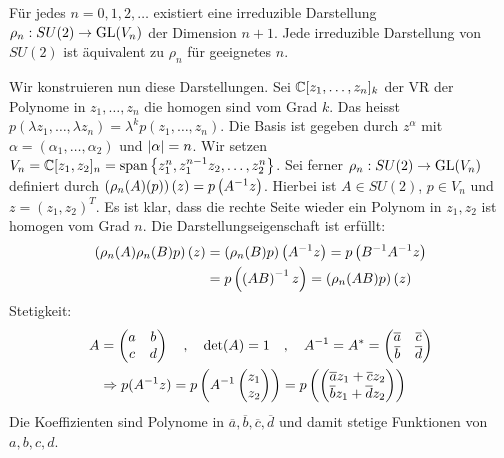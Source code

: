 \begin{satz}
    Für jedes $n=0,1,2,\dots$ existiert eine irreduzible Darstellung $\rho_n :
    SU(2) \rightarrow \text{GL}(V_n)$ der Dimension $n+1$. Jede irreduzible Darstellung
    von $SU(2)$ ist äquivalent zu $\rho_n$ für geeignetes $n$.
\end{satz}

Wir konstruieren nun diese Darstellungen. Sei $\mathbb{C}[z_1,\dots,z_n]_k$ der VR
der Polynome in $z_1,\dots,z_n$ die homogen sind vom Grad $k$. Das heisst
$p(\lambda z_1,\dots,\lambda z_n) = \lambda^k p(z_1,\dots,z_n)$. Die Basis
ist gegeben durch $z^\alpha$ mit $\alpha = (\alpha_1,\dots,\alpha_2)$ und
$\left\vert \alpha \right\vert = n$. Wir setzen $V_n = \mathbb{C}[z_1,z_2]_n = \text{span} \left\{ 
z_1^n , z_1^{n-1} z_2,\dots,z_2^n \right\}$. Sei ferner $\rho_n : SU(2) \rightarrow
\text{GL}(V_n)$ definiert durch $\left( \rho_n (A)(p) \right)(z) = p\left( A^{-1} z \right)$.
Hierbei ist $A \in SU(2)$, $p \in V_n$ und $z=(z_1,z_2)^T$. Es ist klar, dass
die rechte Seite wieder ein Polynom in $z_1,z_2$ ist homogen vom Grad $n$.
Die Darstellungseigenschaft ist erfüllt:
\begin{align*}
    \left( \rho_n(A) \rho_n(B) p \right)(z) &=
    \left( \rho_n(B) p \right) \left( A^{-1} z \right)
    = p \left( B^{-1} A^{-1} z \right)
    \\
    &= p \left( \left( A B \right)^{-1} z \right)
    = \left( \rho_n(A B) p \right)(z)
\end{align*}
Stetigkeit:
\begin{align*}
    A &= \begin{pmatrix}
        a & b \\ c & d
    \end{pmatrix}
    \hspace{10pt} , \hspace{10pt}
    \det(A) = 1
    \hspace{10pt} , \hspace{10pt}
    A^{-1} = A^\ast = \begin{pmatrix}
        \overline{a} & \overline{c} \\ \overline{b} & \overline{d}
    \end{pmatrix}
    \\
    &\Rightarrow p(A^{-1} z) = p \left( A^{-1} \begin{pmatrix}
        z_1 \\ z_2
    \end{pmatrix} \right) = p \left( \begin{pmatrix}
        \overline{a} z_1 + \overline{c} z_2 \\
        \overline{b} z_1 + \overline{d} z_2
    \end{pmatrix} \right)
\end{align*}
Die Koeffizienten sind Polynome in $\overline{a},\overline{b},\overline{c},
\overline{d}$ und damit stetige Funktionen von $a,b,c,d$.

